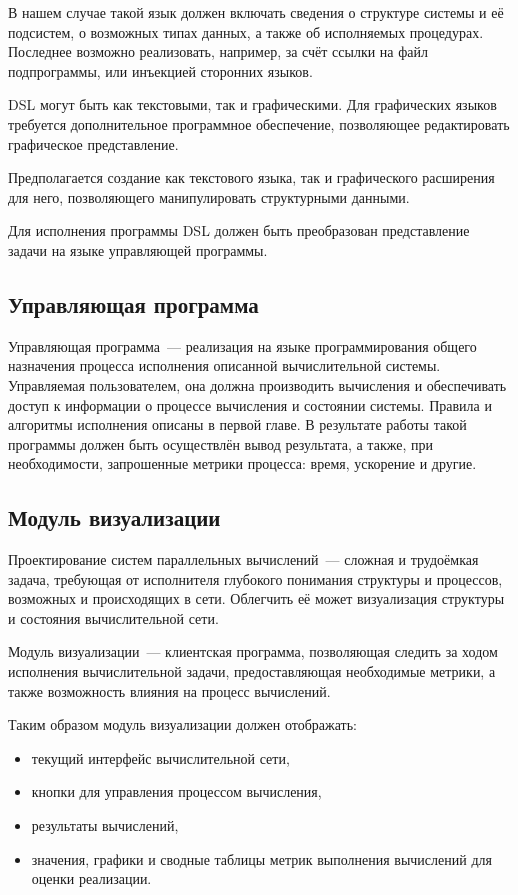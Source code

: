 В нашем случае такой язык должен включать сведения о структуре системы и её подсистем, о возможных типах данных, а также об исполняемых процедурах. 
Последнее возможно реализовать, например, за счёт ссылки на файл подпрограммы, или инъекцией сторонних языков.

DSL могут быть как текстовыми, так и графическими. 
Для графических языков требуется дополнительное программное обеспечение, позволяющее редактировать графическое представление.

Предполагается создание как текстового языка, так и графического расширения \cite{sprinkle2004domain} для него, позволяющего манипулировать структурными данными.

Для исполнения программы DSL должен быть преобразован представление задачи на языке управляющей программы.
\subsection{Управляющая программа}

Управляющая программа~--- реализация на языке программирования общего назначения процесса исполнения описанной вычислительной системы.
Управляемая пользователем, она должна производить вычисления и обеспечивать доступ к информации о процессе вычисления и состоянии системы.
Правила и алгоритмы исполнения описаны в первой главе.
В результате работы такой программы должен быть осуществлён вывод результата, а также, при необходимости, запрошенные метрики процесса: время, ускорение и другие.


\subsection{Модуль визуализации}
Проектирование систем параллельных вычислений~--- сложная и трудоёмкая задача, требующая от исполнителя глубокого понимания структуры и процессов, возможных и происходящих в сети. 
Облегчить её может визуализация структуры и состояния вычислительной сети.

Модуль визуализации~--- клиентская программа, позволяющая следить за ходом исполнения вычислительной задачи, предоставляющая необходимые метрики, а также возможность влияния на процесс вычислений.

Таким образом модуль визуализации должен отображать:
\begin{itemize}
	\item текущий интерфейс вычислительной сети,
	\item кнопки для управления процессом вычисления,
	\item результаты вычислений,
	\item значения, графики и сводные таблицы метрик выполнения вычислений для оценки реализации.
\end{itemize}

